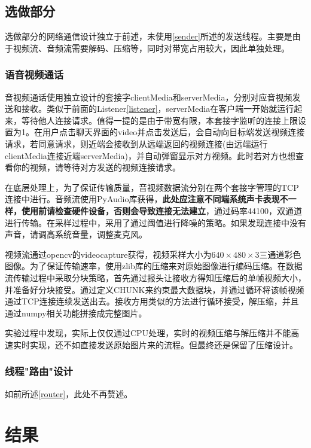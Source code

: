 \documentclass[UTF8]{ctexart}
\begin{document}
\subsection{选做部分}
选做部分的网络通信设计独立于前述，未使用\ref{sender}所述的发送线程。主要是由于视频流、音频流需要解码、压缩等，同时对带宽占用较大，因此单独处理。
\subsubsection{语音视频通话}
音视频通话使用独立设计的套接字clientMedia和serverMedia，分别对应音视频发送和接收。类似于前面的Listener\ref{listener}，serverMedia在客户端一开始就运行起来，等待他人连接请求。值得一提的是由于带宽有限，本套接字监听的连接上限设置为1。在用户点击聊天界面的video并点击发送后，会自动向目标端发送视频连接请求，若同意请求，则近端会接收到从远端返回的视频连接(由远端运行clientMedia连接近端serverMedia)，并自动弹窗显示对方视频。此时若对方也想查看你的视频，请等待对方发送的视频连接请求。

在底层处理上，为了保证传输质量，音视频数据流分别在两个套接字管理的TCP连接中进行。音频流使用PyAudio库获得，\textbf{此处应注意不同端系统声卡表现不一样，使用前请检查硬件设备，否则会导致连接无法建立}，通过码率44100，双通道进行传输。在采样过程中，采用了通过阈值进行降噪的策略。如果发现连接中没有声音，请调高系统音量，调整麦克风。

视频流通过opencv的videocapture获得，视频采样大小为$640\times480\times3$三通道彩色图像。为了保证传输速率，使用zlib库的压缩来对原始图像进行编码压缩。在数据流传输过程中采取分块策略，首先通过报头让接收方得知压缩后的单帧视频大小，并准备好分块接受。通过定义CHUNK来约束最大数据块，并通过循环将该帧视频通过TCP连接连续发送出去。接收方用类似的方法进行循环接受，解压缩，并且通过numpy相关功能拼接成完整图片。

实验过程中发现，实际上仅仅通过CPU处理，实时的视频压缩与解压缩并不能高速实时实现，还不如直接发送原始图片来的流程。但最终还是保留了压缩设计。
\subsubsection{线程"路由"设计}
如前所述\ref{router}，此处不再赘述。
\section{结果}
\end{document}
